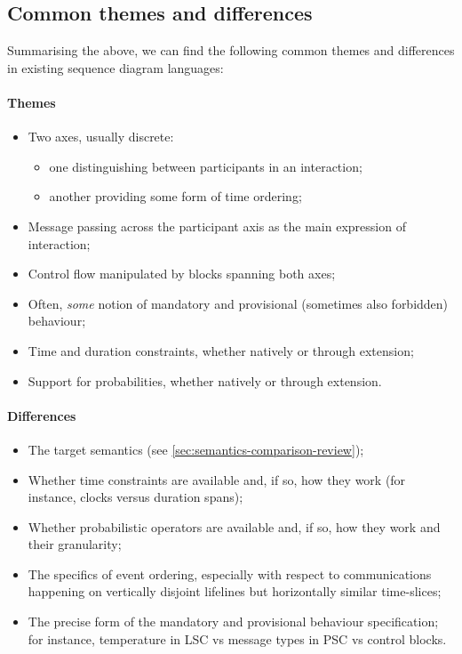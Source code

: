 \subsection{Common themes and differences}

Summarising the above, we can find the following common
themes and differences in existing sequence
diagram languages:

\paragraph{Themes}

\begin{itemize}
\item
  Two axes, usually discrete:
  \begin{itemize}
  \item
    one distinguishing between participants in an interaction;
  \item
    another providing some form of time ordering;
  \end{itemize}
\item
  Message passing across the participant axis as the main expression of
  interaction;
\item
  Control flow manipulated by blocks 
  spanning both axes;
\item
  Often, \emph{some} notion of mandatory and provisional
  (sometimes also forbidden) behaviour;
\item
  Time and duration constraints, whether natively or through extension;
\item
  Support for probabilities, whether natively or through extension.
\end{itemize}

\paragraph{Differences}

\begin{itemize}
\item The target semantics (see
  \cref{sec:semantics-comparison-review});
\item Whether time constraints are available and, if so, how they work
  (for instance, clocks versus duration spans);
\item Whether probabilistic operators are available and, if so, how
  they work and their granularity;
\item The specifics of event ordering, especially with respect to
  communications happening on vertically disjoint lifelines but
  horizontally similar time-slices;
\item The precise form of the mandatory and provisional behaviour
  specification; for instance, temperature in LSC vs message types in
  PSC vs control blocks.
\end{itemize}


